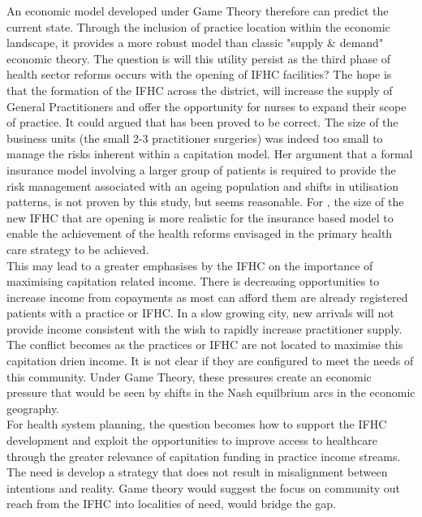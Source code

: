 \documentclass[11pt,a4paper]{article}
\begin{document}
An economic model developed under Game Theory therefore can predict the current state. Through the inclusion of practice location within the economic landscape, it provides a more robust model than classic "supply & demand" economic theory. The question is will this utility persist as the third phase of health sector reforms occurs with the opening of IFHC facilities? The hope is that the formation of the IFHC across the district, will increase the supply of General Practitioners and offer the opportunity for nurses to expand their scope of practice. It could argued that\citet{howell2005restructuring} has been proved to be correct. The size of the business units (the small 2-3 practitioner surgeries) was indeed too small to manage the risks inherent within a capitation model\citep{howell2005restructuring}. Her argument that a formal insurance model involving a larger group of patients is required to provide the risk management associated with an ageing population and shifts in utilisation patterns, is not proven by this study, but seems reasonable. For \citet{howell2005restructuring}, the size of the new IFHC that are opening is more realistic for the insurance based model to enable the achievement of the health reforms envisaged in the primary health care strategy to be achieved.\\

This may lead to a greater emphasises by the IFHC on the importance of maximising capitation related income. There is decreasing opportunities to increase income from copayments as most can afford them are already registered patients with a practice or IFHC. In a slow growing city, new arrivals will not provide income consistent with the wish to rapidly increase practitioner supply. The conflict becomes as the practices or IFHC are not located to maximise this capitation drien income. It is not clear if they are configured to meet the needs of this community. Under Game Theory, these pressures create an economic pressure that would be seen by shifts in the Nash equilbrium arcs in the economic geography.\\

For health system planning, the question becomes how to support the IFHC development and exploit the opportunities to improve access to healthcare through the greater relevance of capitation funding in practice income streams. The need is develop a strategy that does not result in misalignment between intentions and reality\citep{kerr1995folly}. Game theory would suggest the focus on community out reach from the IFHC into localities of need, would bridge the gap.\\
\end{document}
